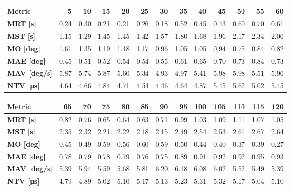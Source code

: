 \begin{tabular*}{\textwidth}{@{\extracolsep{\fill}}l|rrrrrrrrrrrr}
    \toprule
    \textbf{Metric} & \textbf{5} & \textbf{10} & \textbf{15} & \textbf{20} & \textbf{25} & \textbf{30} & \textbf{35} & \textbf{40} & \textbf{45} & \textbf{50} & \textbf{55} & \textbf{60} \\
    \midrule
    \textbf{MRT [s]} & 0.24 & 0.30 & 0.21 & 0.21 & 0.26 & 0.18 & 0.52 & 0.45 & 0.43 & 0.60 & 0.70 & 0.61 \\
    \textbf{MST [s]} & 1.15 & 1.29 & 1.45 & 1.45 & 1.42 & 1.57 & 1.80 & 1.68 & 1.96 & 2.17 & 2.34 & 2.06 \\
    \textbf{MO  [deg]} & 1.61 & 1.35 & 1.19 & 1.18 & 1.17 & 0.96 & 1.05 & 1.05 & 0.94 & 0.75 & 0.84 & 0.82 \\
    \textbf{MAE [deg]} & 0.45 & 0.51 & 0.52 & 0.54 & 0.54 & 0.55 & 0.61 & 0.65 & 0.70 & 0.73 & 0.84 & 0.73 \\
    \textbf{MAV [deg/s]} & 5.87 & 5.74 & 5.87 & 5.60 & 5.34 & 4.93 & 4.97 & 5.41 & 5.98 & 5.98 & 5.51 & 5.96 \\
    \textbf{NTV [\si{\micro\second}]} & 4.64 & 4.66 & 4.84 & 4.71 & 4.54 & 4.46 & 4.64 & 4.87 & 5.45 & 5.62 & 5.02 & 5.45 \\
    \bottomrule
\end{tabular*}

\begin{tabular*}{\textwidth}{@{\extracolsep{\fill}}l|rrrrrrrrrrrr}
    \toprule
    \textbf{Metric} & \textbf{65} & \textbf{70} & \textbf{75} & \textbf{80} & \textbf{85} & \textbf{90} & \textbf{95} & \textbf{100} & \textbf{105} & \textbf{110} & \textbf{115} & \textbf{120} \\
    \midrule
    \textbf{MRT [s]} & 0.82 & 0.76 & 0.65 & 0.64 & 0.63 & 0.71 & 0.99 & 1.03 & 1.09 & 1.11 & 1.07 & 1.05 \\
    \textbf{MST [s]} & 2.35 & 2.32 & 2.21 & 2.22 & 2.18 & 2.15 & 2.49 & 2.54 & 2.53 & 2.61 & 2.67 & 2.64 \\
    \textbf{MO  [deg]} & 0.45 & 0.49 & 0.59 & 0.56 & 0.60 & 0.59 & 0.50 & 0.44 & 0.40 & 0.37 & 0.39 & 0.27 \\
    \textbf{MAE [deg]} & 0.78 & 0.79 & 0.78 & 0.79 & 0.76 & 0.75 & 0.89 & 0.91 & 0.92 & 0.92 & 0.95 & 0.93 \\
    \textbf{MAV [deg/s]} & 5.39 & 5.94 & 5.59 & 5.68 & 5.81 & 6.20 & 6.18 & 6.08 & 6.02 & 5.52 & 5.49 & 5.39 \\
    \textbf{NTV [\si{\micro\second}]} & 4.79 & 4.89 & 5.02 & 5.10 & 5.17 & 5.13 & 5.23 & 5.31 & 5.32 & 5.17 & 5.04 & 5.10 \\
    \bottomrule
\end{tabular*}

